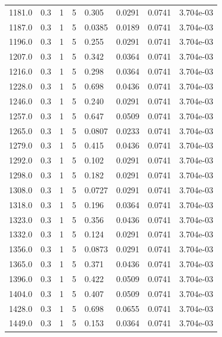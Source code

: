 \documentclass[preview]{standalone}
\begin{document}
{{{{{\begin{tabular}{L{1.2cm}C{1.2cm} C{0.3cm}C{0.5cm} C{1.4cm}C{1.4cm} C{1.4cm}C{1.4cm}}
  1181.0  &   0.3  & 1     &  5 &  0.305  & 0.0291  & 0.0741 &  3.704e-03   \\ 
  1187.0  &   0.3  & 1     &  5 &  0.0385  & 0.0189  & 0.0741 &  3.704e-03   \\ 
  1196.0  &   0.3  & 1     &  5 &  0.255  & 0.0291  & 0.0741 &  3.704e-03   \\ 
  1207.0  &   0.3  & 1     &  5 &  0.342  & 0.0364  & 0.0741 &  3.704e-03   \\ 
  1216.0  &   0.3  & 1     &  5 &  0.298  & 0.0364  & 0.0741 &  3.704e-03   \\ 
  1228.0  &   0.3  & 1     &  5 &  0.698  & 0.0436  & 0.0741 &  3.704e-03   \\ 
  1246.0  &   0.3  & 1     &  5 &  0.240  & 0.0291  & 0.0741 &  3.704e-03   \\ 
  1257.0  &   0.3  & 1     &  5 &  0.647  & 0.0509  & 0.0741 &  3.704e-03   \\ 
  1265.0  &   0.3  & 1     &  5 &  0.0807  & 0.0233  & 0.0741 &  3.704e-03   \\ 
  1279.0  &   0.3  & 1     &  5 &  0.415  & 0.0436  & 0.0741 &  3.704e-03   \\ 
  1292.0  &   0.3  & 1     &  5 &  0.102  & 0.0291  & 0.0741 &  3.704e-03   \\ 
  1298.0  &   0.3  & 1     &  5 &  0.182  & 0.0291  & 0.0741 &  3.704e-03   \\ 
  1308.0  &   0.3  & 1     &  5 &  0.0727  & 0.0291  & 0.0741 &  3.704e-03   \\ 
  1318.0  &   0.3  & 1     &  5 &  0.196  & 0.0364  & 0.0741 &  3.704e-03   \\ 
  1323.0  &   0.3  & 1     &  5 &  0.356  & 0.0436  & 0.0741 &  3.704e-03   \\ 
  1332.0  &   0.3  & 1     &  5 &  0.124  & 0.0291  & 0.0741 &  3.704e-03   \\ 
  1356.0  &   0.3  & 1     &  5 &  0.0873  & 0.0291  & 0.0741 &  3.704e-03   \\ 
  1365.0  &   0.3  & 1     &  5 &  0.371  & 0.0436  & 0.0741 &  3.704e-03   \\ 
  1396.0  &   0.3  & 1     &  5 &  0.422  & 0.0509  & 0.0741 &  3.704e-03   \\ 
  1404.0  &   0.3  & 1     &  5 &  0.407  & 0.0509  & 0.0741 &  3.704e-03   \\ 
  1428.0  &   0.3  & 1     &  5 &  0.698  & 0.0655  & 0.0741 &  3.704e-03   \\ 
  1449.0  &   0.3  & 1     &  5 &  0.153  & 0.0364  & 0.0741 &  3.704e-03   \\ 

\end{tabular}}}}}}
\end{document}
